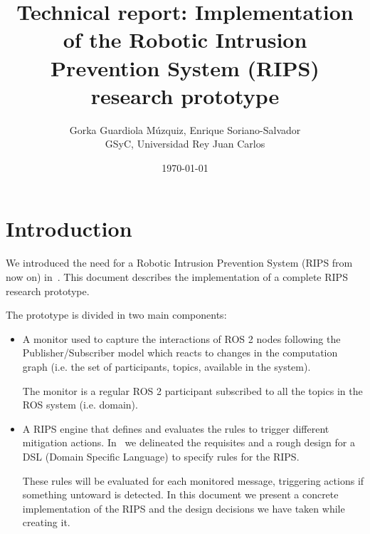 \documentclass[a4paper]{article}
\begin{document}


\lstset{language=Rips, style=rips}

\title{Technical report: Implementation of the Robotic Intrusion
Prevention System (RIPS) research prototype}
\author{Gorka Guardiola Múzquiz, Enrique Soriano-Salvador\\
\centering \footnotesize GSyC, Universidad Rey Juan Carlos}
\date{\today}

\maketitle
\section{Introduction}
We introduced the need for a Robotic Intrusion Prevention System (RIPS
from now on) in~\cite{rips}. This document describes the implementation
of a complete RIPS research prototype.

The prototype is divided in two main components:

\begin{itemize}
	\item A monitor used to capture the interactions of ROS 2 nodes
	following the Publisher/Subscriber model which reacts to changes
	in the computation graph (i.e. the set of participants, topics,
	available in the system).

	The monitor is a regular ROS 2
	participant subscribed to all the topics in the ROS system
	(i.e. domain).

	\item A RIPS engine that defines and evaluates the rules to trigger different
	mitigation actions. In~\cite{rips} we delineated the requisites and a
	rough design for a DSL (Domain Specific Language) to specify rules for
	the RIPS.

	These rules will be evaluated for each monitored message, triggering
	actions if something untoward is detected. In
	this document we present a concrete implementation of the RIPS and the
	design decisions we have taken while creating it.
\end{itemize}
\end{document}
